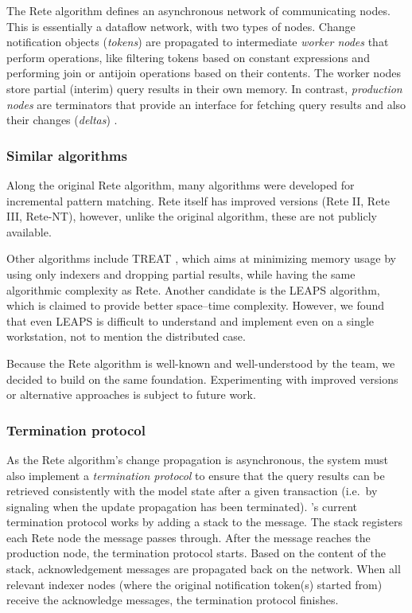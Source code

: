 The Rete algorithm defines an asynchronous network of communicating nodes. This is essentially a dataflow network, with two types of nodes. Change notification objects (\emph{tokens}) are propagated to intermediate \emph{worker nodes} that perform operations, like filtering tokens based on constant expressions and performing join or antijoin operations based on their contents. The worker nodes store partial (interim) query results in their own memory. In contrast, \emph{production nodes} are terminators that provide an interface for fetching query results and also their changes (\emph{deltas}) . %

\subsubsection{Similar algorithms}

Along the original Rete algorithm, many algorithms were developed for incremental pattern matching. Rete itself has improved versions (Rete II, Rete III, Rete-NT), however, unlike the original algorithm, these are not publicly available. 

Other algorithms include TREAT \cite{Miranker:1991:OPT:627280.627434}, which aims at minimizing memory usage by using only indexers and dropping partial results, while having the same algorithmic complexity as Rete. Another candidate is the LEAPS \cite{Batory:1994:LA:899216} algorithm, which is claimed to provide better space--time complexity. However, we found that even LEAPS is difficult to understand and implement even on a single workstation, not to mention the distributed case. 

Because the Rete algorithm is well-known and well-understood by the \eiq{} team, we decided to build \iqd{} on the same foundation. Experimenting with improved versions or alternative approaches is subject to future work.

\subsubsection{Termination protocol}

As the Rete algorithm's change propagation is asynchronous, the system must also implement a \emph{termination protocol} to ensure that the query results can be retrieved consistently with the model state after a given transaction (i.e.\ by signaling when the update propagation has been terminated). \iqd{}'s current termination protocol works by adding a stack to the message. The stack registers each Rete node the message passes through. After the message reaches the production node, the termination protocol starts. Based on the content of the stack, acknowledgement messages are propagated back on the network. When all relevant indexer nodes (where the original notification token(s) started from) receive the acknowledge messages, the termination protocol finishes.

